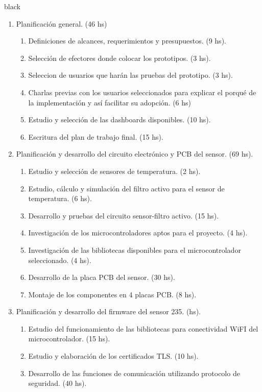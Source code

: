 \documentclass[11pt]{charter}
\begin{document}
\begin{consigna}{black}
\begin{enumerate}
\item Planificación general. (46 hs)
	\begin{enumerate}
	\item Definiciones de alcances, requerimientos y presupuestos. (9 hs).
	\item Selección de efectores donde colocar los prototipos. (3 hs).
	\item Seleccion de usuarios que harán las pruebas del prototipo. (3 hs).
	\item Charlas previas con los usuarios seleccionados para explicar el porqué de la implementación y así facilitar su adopción. (6 hs)
	\item Estudio y selección de las dashboards disponibles. (10 hs).
	\item Escritura del plan de trabajo final. (15 hs).
	\end{enumerate}
\item Planificación y desarrollo del circuito electrónico y PCB del sensor. (69 hs).
	\begin{enumerate}
	\item Estudio y selección de sensores de temperatura. (2 hs).
	\item Estudio, cálculo y simulación del filtro activo para el sensor de temperatura. (6 hs).
	\item Desarrollo y pruebas del circuito sensor-filtro activo. (15 hs).
    \item Investigación de los microcontroladores aptos para el proyecto. (4 hs).	
	\item Investigación de las bibliotecas disponibles para el microcontrolador seleccionado. (4 hs).
	\item Desarrollo de la placa PCB del sensor. (30 hs).
	\item Montaje de los componentes en 4 placas PCB. (8 hs).
	\end{enumerate}
\item Planificación y desarrollo del firmware del sensor 235.  (hs).
	\begin{enumerate}
	\item Estudio del funcionamiento de las bibliotecas para conectividad WiFI del microcontrolador. (15 hs).
	\item Estudio y elaboración de los certificados TLS.  (10 hs).
	\item Desarrollo de las funciones de comunicación utilizando protocolo de seguridad. (40 hs).

\end{enumerate}
\end{enumerate}
\end{consigna}
\end{document}
